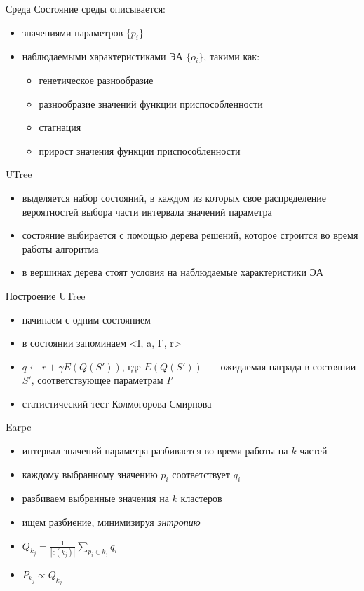 \documentclass[hyperref=unicode,graphics=pdflatex,13pt]{beamer}
\begin{document}
\begin{frame}{Среда}
 Состояние среды описывается:
 \begin{itemize}
     \item значениями параметров $\{p_i\}$
     \item наблюдаемыми характеристиками ЭА $\{o_i\}$, такими как:
     \begin{itemize}
        \item генетическое разнообразие
        \item разнообразие значений функции приспособленности
        \item стагнация
        \item прирост значения функции приспособленности
     \end{itemize}
 \end{itemize}
\end{frame}

\begin{frame} {UTree}
  \begin{itemize}
    \item выделяется набор состояний, в каждом из которых свое распределение вероятностей выбора части интервала значений параметра
    \item состояние выбирается с помощью дерева решений, которое строится во время работы алгоритма
    \item в вершинах дерева стоят условия на наблюдаемые характеристики ЭА
  \end{itemize}
\end{frame}

\begin{frame}{Построение UTree}
    \begin{itemize}
        \item начинаем с одним состоянием
        \item в состоянии запоминаем <I, a, I', r>
        \item $q \gets r + \gamma E(Q(S'))$, где $E(Q(S'))$~--- ожидаемая награда в состоянии $S'$, соответствующее параметрам $I'$
        \item статистический тест Колмогорова-Смирнова
    \end{itemize}
\end{frame}


\begin{frame}{Earpc}
  \begin{itemize}
    \item интервал значений параметра разбивается во время работы на $k$ частей
    \item каждому выбранному значению $p_i$ соответствует $q_i$
    \item разбиваем выбранные значения на $k$ кластеров
    \item ищем разбиение, минимизируя \textit{энтропию}
    \item $Q_{k_j} = \frac{1}{|c(k_j)|}\sum_{p_i \in k_j}{q_i}$
    \item $P_{k_j} \propto Q_{k_j}$
  \end{itemize}
\end{frame}
\end{document}
